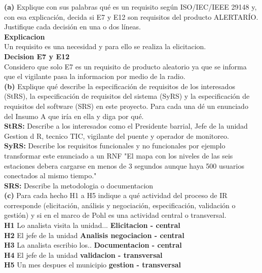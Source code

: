 \documentclass[11pt]{article}
\begin{document}
\begin{cajatarea}[title={T1. Conceptos aplicados al caso \hfill D1 · 10\,\%}]
	\textbf{(a)} Explique con sus palabras qué es un requisito según ISO/IEC/IEEE 29148 y, con esa explicación, decida si E7 y E12 son requisitos del producto ALERTARÍO. Justifique cada decisión en una o dos líneas.\\[2pt]
    \textbf{Explicacion}\\
    Un requisito es una necesidad y para ello se realiza la elicitacion.\\[2pt]
    \textbf{Decision E7 y E12}\\
    Considero que solo E7 es un requisito de producto aleatorio ya que se informa que el vigilante pasa la informacion por medio de la radio.\\[4pt]
	\textbf{(b)} Explique qué describe la especificación de requisitos de los interesados (StRS), la especificación de requisitos del sistema (SyRS) y la especificación de requisitos del software (SRS) en este proyecto. Para cada una dé un enunciado del Insumo A que iría en ella y diga por qué.\\[2pt]
    \textbf{StRS:} Describe a los interesados como el Presidente barrial, Jefe de la unidad Gestion d R, tecnico TIC, vigilante del puente y operador de monitoreo.\\[2pt]
    \textbf{SyRS:} Describe los requisitos funcionales y no funcionales por ejemplo transformar este enunciado a un RNF "El mapa con los niveles de las seis estaciones debera cargarse en menos de 3 segundos aunque haya 500 usuarios conectados al mismo tiempo."\\[2pt]
    \textbf{SRS:} Describe la metodologia o documentacion\\[4pt]
	\textbf{(c)} Para cada hecho H1 a H5 indique a qué actividad del proceso de IR corresponde (elicitación, análisis y negociación, especificación, validación o gestión) y si en el marco de Pohl es una actividad central o transversal.\\[2pt]
    \textbf{H1} Lo analista visita la unidad... \textbf{Elicitacion - central}\\[2pt]
    \textbf{H2} El jefe de la unidad \textbf{Analisis negociacion - central}\\[2pt]
    \textbf{H3} La analista escribio los.. \textbf{Documentacion - central}\\[2pt]
    \textbf{H4} El jefe de la unidad \textbf{validacion - transversal}\\[2pt]
    \textbf{H5} Un mes despues el municipio \textbf{gestion - transversal}\\[4pt]
 
\end{cajatarea}
\end{document}
